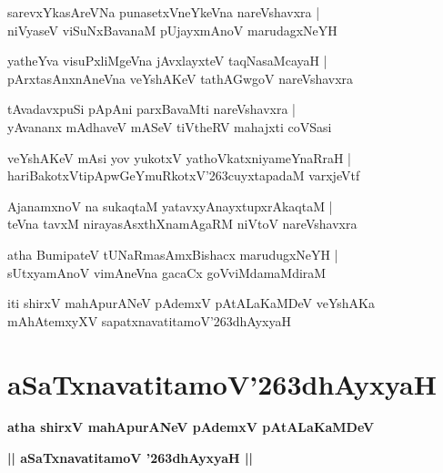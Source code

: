 \documentclass[twoside,12pt,openright]{book}
\def\S{\char'263}
\newcounter{shloka}[chapter]
\begin{document}
\begin{shloka}%
sarevxYkasAreVNa punasetxVneYkeVna nareVshavxra |\\
niVyaseV viSuNxBavanaM  pUjayxmAnoV marudagxNeYH 
\end{shloka}

\begin{shloka}%
yatheYva visuPxliMgeVna jAvxlayxteV taqNasaMcayaH |\\
pArxtasAnxnAneVna veYshAKeV tathAGwgoV nareVshavxra
\end{shloka}

\begin{shloka}%
tAvadavxpuSi pApAni parxBavaMti nareVshavxra |\\
yAvananx mAdhaveV mASeV tiVtheRV mahajxti coVSasi
\end{shloka}

\begin{shloka}%
veYshAKeV mAsi yov yukotxV yathoVkatxniyameYnaRraH |\\
hariBakotxVtipApwGeYmuRkotxV\S cuyxtapadaM varxjeVtf
\end{shloka}

\begin{shloka}%
AjanamxnoV na sukaqtaM yatavxyAnayxtupxrAkaqtaM |\\
teVna tavxM nirayasAsxthXnamAgaRM niVtoV nareVshavxra
\end{shloka}

\begin{shloka}%
atha BumipateV tUNaRmasAmxBishacx marudugxNeYH |\\
sUtxyamAnoV vimAneVna gacaCx goVviMdamaMdiraM 
\end{shloka}

\begin{center}
iti shirxV mahApurANeV pAdemxV pAtALaKaMDeV veYshAKa mAhAtemxyXV 
sapatxnavatitamoV\S dhAyxyaH
\end{center}

\chapter{aSaTxnavatitamoV\S dhAyxyaH}

\begin{center}
{\LARGE\bfseries atha shirxV mahApurANeV pAdemxV pAtALaKaMDeV }
\end{center}

\begin{center}         
{\LARGE\bfseries || aSaTxnavatitamoV \S dhAyxyaH ||}
\end{center}
\end{document}
